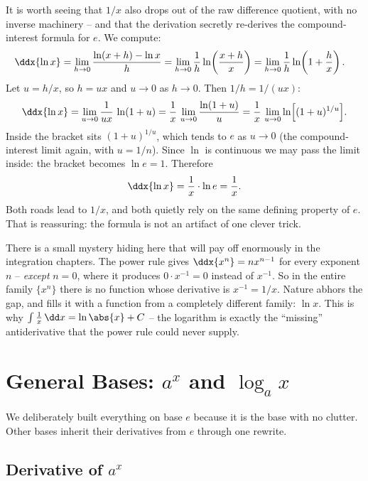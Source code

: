 It is worth seeing that $1/x$ also drops out of the raw difference quotient,
with no inverse machinery -- and that the derivation secretly re-derives the
compound-interest formula for $e$. We compute:
\begin{align*}
\ddx{\ln x}
&= \lim_{h\to 0}\frac{\ln(x+h)-\ln x}{h}
 = \lim_{h\to 0}\frac{1}{h}\ln\!\left(\frac{x+h}{x}\right)
 = \lim_{h\to 0}\frac{1}{h}\ln\!\left(1+\frac{h}{x}\right).
\end{align*}
Let $u = h/x$, so $h = ux$ and $u\to 0$ as $h\to 0$. Then $1/h = 1/(ux)$:
\[
\ddx{\ln x}
 = \lim_{u\to 0}\frac{1}{ux}\,\ln(1+u)
 = \frac{1}{x}\,\lim_{u\to 0}\frac{\ln(1+u)}{u}
 = \frac{1}{x}\,\lim_{u\to 0}\ln\!\Big[(1+u)^{1/u}\Big].
\]
Inside the bracket sits $(1+u)^{1/u}$, which tends to $e$ as $u\to 0$ (the
compound-interest limit again, with $u=1/n$). Since $\ln$ is continuous we
may pass the limit inside: the bracket becomes $\ln e = 1$. Therefore
\[
   \ddx{\ln x} = \frac{1}{x}\cdot \ln e = \frac{1}{x}.
\]
Both roads lead to $1/x$, and both quietly rely on the same defining
property of $e$. That is reassuring: the formula is not an artifact of one
clever trick.

\begin{aestheticbox}
There is a small mystery hiding here that will pay off enormously in the
integration chapters. The power rule gives $\ddx{x^n} = n x^{n-1}$ for every
exponent $n$ -- \emph{except} $n=0$, where it produces $0\cdot x^{-1}=0$
instead of $x^{-1}$. So in the entire family $\{x^n\}$ there is no function
whose derivative is $x^{-1}=1/x$. Nature abhors the gap, and fills it with a
function from a completely different family: $\ln x$. This is why
$\int \frac{1}{x}\,\dd x = \ln\abs{x}+C$ -- the logarithm is exactly the
``missing'' antiderivative that the power rule could never supply.
\end{aestheticbox}

\section{General Bases: $a^x$ and $\log_a x$}
\label{ch12:general-base}

We deliberately built everything on base $e$ because it is the base with no
clutter. Other bases inherit their derivatives from $e$ through one rewrite.

\subsection{Derivative of $a^x$}

